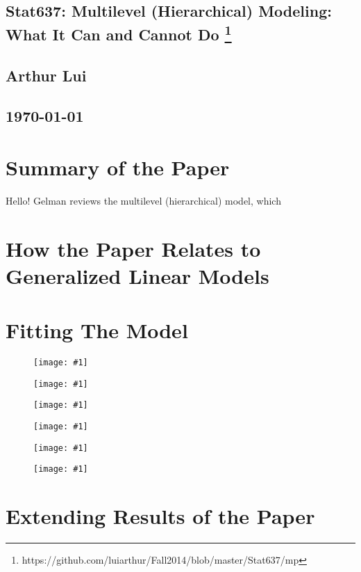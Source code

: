 \documentclass{article}
\def\beginmyfig{\begin{figure}[htbp]\begin{center}}
\def\endmyfig{\end{center}\end{figure}}
\def\myfig#1{\beginmyfig\texttt{[image: \#1]}\endmyfig}
\begin{document}
\begin{center}
  \section*{\textbf{Stat637: Multilevel (Hierarchical) Modeling: What It Can and Cannot Do}
    \footnote{https://github.com/luiarthur/Fall2014/blob/master/Stat637/mp}
  }  
  \subsection*{\textbf{Arthur Lui}}
  \subsection*{\noindent\today}
\end{center}

\section{Summary of the Paper}
Hello!
Gelman reviews the multilevel (hierarchical) model, which 

\section{How the Paper Relates to Generalized Linear Models}

\section{Fitting The Model}
\myfig{images/apost.pdf}
\myfig{images/bpost.pdf}
\myfig{images/gpost.pdf}
\myfig{images/sy2post.pdf}
\myfig{images/sa2post.pdf}
\myfig{images/au.pdf}

\section{Extending Results of the Paper}
\end{document}
